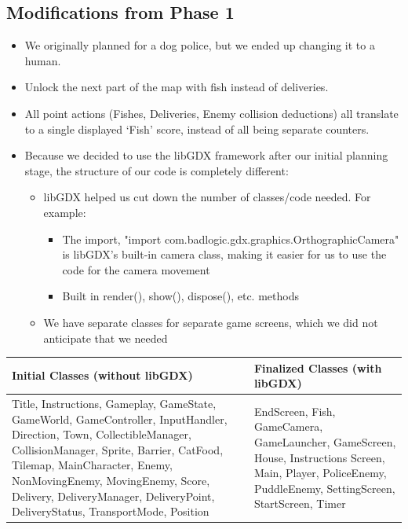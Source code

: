 \documentclass[12pt]{article}
\begin{document}
\subsection{Modifications from Phase 1}
	\begin{itemize}[itemsep=0pt]
    \item We originally planned for a dog police, but we ended up changing it to a human.
    \item Unlock the next part of the map with fish instead of deliveries.
    \item All point actions (Fishes, Deliveries, Enemy collision deductions) all translate to a single displayed ‘Fish’ score, instead of all being separate counters.
    \item Because we decided to use the libGDX framework after our initial planning  stage, the structure of our code is completely different:
    \begin{itemize}[topsep=2pt]
    \item libGDX helped us cut down the number of classes/code needed. For example:
    	\begin{itemize}
    	\item The import, "import com.badlogic.gdx.graphics.OrthographicCamera" is libGDX’s built-in camera class, making it easier for us to use the code for the camera movement
		\item Built in render(), show(), dispose(), etc. methods
    	\end{itemize}
    
	\item We have separate classes for separate game screens, which we did not anticipate that we needed
    \end{itemize}

	\end{itemize}
	\renewcommand{\arraystretch}{1.5}
	\setlength{\tabcolsep}{12pt}
	\begin{table}[H]
	\centering
	\begin{tabular}{|p{}|p{}|}
	\hline
	\textbf{Initial Classes (without libGDX)} & \textbf{Finalized Classes (with libGDX)} \\
	\hline
Title, Instructions, Gameplay, GameState, GameWorld, GameController, InputHandler, Direction, Town, CollectibleManager, CollisionManager, Sprite, Barrier, CatFood, Tilemap, MainCharacter, Enemy, NonMovingEnemy, MovingEnemy, Score, Delivery, DeliveryManager, DeliveryPoint, DeliveryStatus, TransportMode, Position
&
EndScreen, Fish, GameCamera, GameLauncher, GameScreen, House, Instructions Screen, Main, Player, PoliceEnemy, PuddleEnemy, SettingScreen, StartScreen, Timer
	\\
	\hline
	\end{tabular}
	\end{table}
\end{document}
